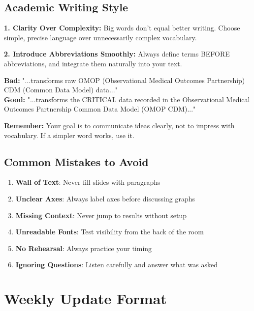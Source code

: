 \documentclass[11pt,a4paper]{article}
\begin{document}
\subsection{Academic Writing Style}

\begin{tcolorbox}[colback=yellow!5,colframe=orange!60,title={Some Personal Writing Advice }]
\textbf{1. Clarity Over Complexity:} Big words don't equal better writing. Choose simple, precise language over unnecessarily complex vocabulary.

\textbf{2. Introduce Abbreviations Smoothly:} Always define terms BEFORE abbreviations, and integrate them naturally into your text.

\textbf{Bad:} "...transforms raw OMOP (Observational Medical Outcomes Partnership) CDM (Common Data Model) data..."\\
\textbf{Good:} "...transforms the CRITICAL data recorded in the Observational Medical Outcomes Partnership Common Data Model (OMOP CDM)..."

\textbf{Remember:} Your goal is to communicate ideas clearly, not to impress with vocabulary. If a simpler word works, use it.
\end{tcolorbox}

\subsection{Common Mistakes to Avoid}

\begin{tcolorbox}[colback=red!10,colframe=red!50,title=Don't Do This!]
\begin{enumerate}
    \item \textbf{Wall of Text}: Never fill slides with paragraphs
    \item \textbf{Unclear Axes}: Always label axes before discussing graphs
    \item \textbf{Missing Context}: Never jump to results without setup
    \item \textbf{Unreadable Fonts}: Test visibility from the back of the room
    \item \textbf{No Rehearsal}: Always practice your timing
    \item \textbf{Ignoring Questions}: Listen carefully and answer what was asked
\end{enumerate}
\end{tcolorbox}


\section{Weekly Update Format}
\end{document}
